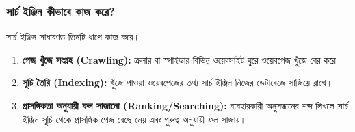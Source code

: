 \subsubsection{সার্চ ইঞ্জিন কীভাবে কাজ করে?}

সার্চ ইঞ্জিন সাধারণত তিনটি ধাপে কাজ করে।

\begin{enumerate}
\item \textbf{পেজ খুঁজে সংগ্রহ (Crawling):} ক্রলার বা স্পাইডার বিভিন্ন ওয়েবসাইট ঘুরে ওয়েবপেজ খুঁজে বের করে।
\item \textbf{সূচি তৈরি (Indexing):} খুঁজে পাওয়া ওয়েবপেজের তথ্য সার্চ ইঞ্জিন নিজের ডেটাবেজে সাজিয়ে রাখে।
\item \textbf{প্রাসঙ্গিকতা অনুযায়ী ফল সাজানো (Ranking/Searching):} ব্যবহারকারী অনুসন্ধানের শব্দ লিখলে সার্চ ইঞ্জিন সূচি থেকে প্রাসঙ্গিক পেজ বেছে নেয় এবং গুরুত্ব অনুযায়ী ফল সাজায়।
\end{enumerate}

\begin{center}
\end{center}

